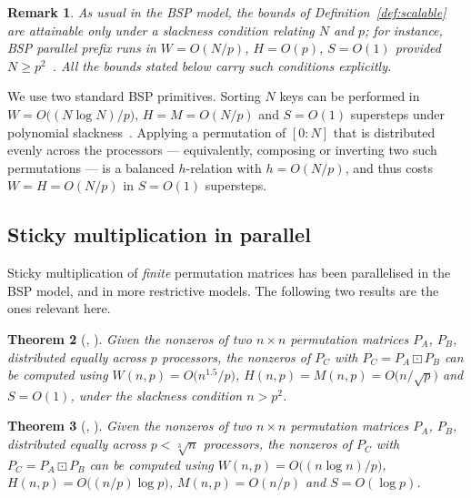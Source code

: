 \documentclass[10pt]{article}
\newtheorem{theorem}{Theorem}
\newtheorem{remark}[theorem]{Remark}
\newcommand{\stick}{\boxdot}
\begin{document}
\begin{remark}\label{rem:slackness}
As usual in the BSP model, the bounds of Definition~\ref{def:scalable} are
attainable only under a \emph{slackness} condition relating $N$ and $p$; for
instance, BSP parallel prefix runs in $W=O(N/p)$, $H=O(p)$, $S=O(1)$ provided
$N\ge p^2$~\cite[Example 2.3.6]{KruscheThesis}. All the bounds stated below
carry such conditions explicitly.
\end{remark}

We use two standard BSP primitives. Sorting $N$ keys can be performed in
$W=O\bigl((N\log N)/p\bigr)$, $H=M=O(N/p)$ and $S=O(1)$ supersteps under
polynomial slackness~\cite{Goodrich99,GV94}. Applying a permutation of
$[0:N]$ that is distributed evenly across the processors --- equivalently,
composing or inverting two such permutations --- is a balanced $h$-relation
with $h=O(N/p)$, and thus costs $W=H=O(N/p)$ in $S=O(1)$ supersteps.

\subsection{Sticky multiplication in parallel}\label{sec:bspsticky}

Sticky multiplication of \emph{finite} permutation matrices has been
parallelised in the BSP model, and in more restrictive models. The following
two results are the ones relevant here.

\begin{theorem}[{\cite{KT07}}, {\cite[Section 4.2]{KruscheThesis}}]
\label{thm:kt07}
Given the nonzeros of two $n\times n$ permutation matrices $P_A$, $P_B$,
distributed equally across $p$ processors, the nonzeros of $P_C$ with
$P_C=P_A\stick P_B$ can be computed using
$W(n,p)=O\bigl(n^{1.5}/p\bigr)$,
$H(n,p)=M(n,p)=O\bigl(n/\sqrt p\bigr)$ and $S=O(1)$, under the slackness
condition $n>p^2$.
\end{theorem}

\begin{theorem}[{\cite{KT10}}, {\cite[Lemma 4.3.3]{KruscheThesis}}]
\label{thm:kt10}
Given the nonzeros of two $n\times n$ permutation matrices $P_A$, $P_B$,
distributed equally across $p<\sqrt[3]{n}$ processors, the nonzeros of $P_C$
with $P_C=P_A\stick P_B$ can be computed using
$W(n,p)=O\bigl((n\log n)/p\bigr)$, $H(n,p)=O\bigl((n/p)\log p\bigr)$,
$M(n,p)=O(n/p)$ and $S=O(\log p)$.
\end{theorem}
\end{document}
